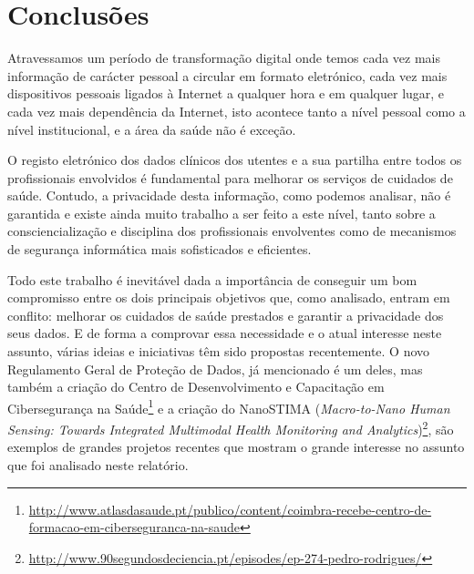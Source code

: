 \documentclass[conference]{IEEEtran}
\begin{document}

\section{Conclusões}	\label{concl}

Atravessamos um período de transformação digital onde temos cada vez mais informação de carácter pessoal a circular em formato eletrónico, cada vez mais dispositivos pessoais ligados à Internet a qualquer hora e em qualquer lugar, e cada vez mais dependência da Internet, isto acontece tanto a nível pessoal como a nível institucional, e a área da saúde não é exceção.	

O registo eletrónico dos dados clínicos dos utentes e a sua partilha entre todos os profissionais envolvidos é fundamental para melhorar os serviços de cuidados de saúde. Contudo, a privacidade desta informação, como podemos analisar, não é garantida e existe ainda muito trabalho a ser feito a este nível, tanto sobre a consciencialização e disciplina dos profissionais envolventes como de mecanismos de segurança informática mais sofisticados e eficientes.

Todo este trabalho é inevitável dada a importância de conseguir um bom compromisso entre os dois principais objetivos que, como analisado, entram em conflito: melhorar os cuidados de saúde prestados e garantir a privacidade dos seus dados. E de forma a comprovar essa necessidade e o atual interesse neste assunto, várias ideias e iniciativas têm sido propostas recentemente. O novo Regulamento Geral de Proteção de Dados, já mencionado é um deles, mas também a criação do Centro de Desenvolvimento e Capacitação em Cibersegurança na Saúde\footnote{\url{http://www.atlasdasaude.pt/publico/content/coimbra-recebe-centro-de-formacao-em-ciberseguranca-na-saude}} e a criação do NanoSTIMA (\textit{Macro-to-Nano Human Sensing: Towards Integrated Multimodal Health Monitoring and Analytics})\footnote{\url{http://www.90segundosdeciencia.pt/episodes/ep-274-pedro-rodrigues/}}, são exemplos de grandes projetos recentes que mostram o grande interesse no assunto que foi analisado neste relatório.


{}

\end{document}
